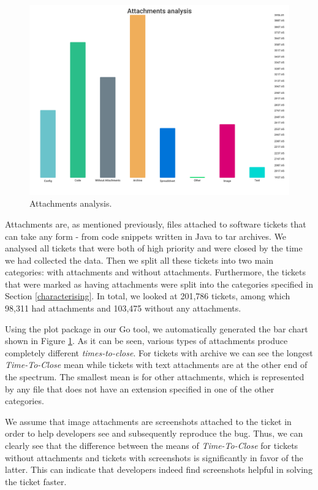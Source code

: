\documentclass{mpaper}
\begin{document}
\begin{figure}[ht]
  \begin{center}
  \includegraphics[scale=0.18]{images/attachments.png}
  \end{center}
  \caption{\label{attachments}Attachments analysis.}
\end{figure}

Attachments are, as mentioned previously, files attached to software tickets that can take any form - from code 
snippets written in Java to tar archives. We analysed all tickets that were both of high priority and
were closed by the time we had collected the data. Then we split all these tickets into two main categories: 
with attachments and without attachments. Furthermore, the tickets that were marked as having attachments were split 
into the categories specified in Section \ref{characterising}. In total, we looked at 201,786 tickets, among which 
98,311 had attachments and 103,475 without any attachments.

Using the plot package in our Go tool, we automatically generated the bar chart shown in Figure \ref{attachments}. 
As it can be seen, various types of attachments produce completely different \emph{times-to-close}. For 
tickets with archive we can see the longest \emph{Time-To-Close} mean while tickets with text attachments are at 
the other end of the spectrum. The smallest mean is for other attachments, which is represented by any file 
that does not have an extension specified in one of the other categories. 

We assume that image attachments are screenshots attached to the ticket in order to help developers see and 
subsequently reproduce the bug. Thus, we can clearly see that the difference between the means of \emph{Time-To-Close} 
for tickets without attachments and tickets with screenshots is significantly in favor of the latter. This can 
indicate that developers indeed find screenshots helpful in solving the ticket faster.
\end{document}
